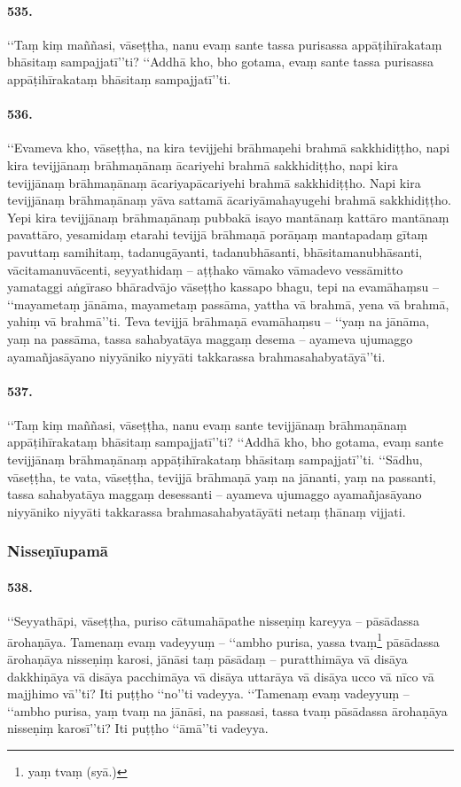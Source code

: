 \paragraph{535.} ‘‘Taṃ kiṃ maññasi, vāseṭṭha, nanu evaṃ sante tassa purisassa appāṭihīrakataṃ bhāsitaṃ sampajjatī’’ti? ‘‘Addhā kho, bho gotama, evaṃ sante tassa purisassa appāṭihīrakataṃ bhāsitaṃ sampajjatī’’ti.

\paragraph{536.} ‘‘Evameva kho, vāseṭṭha, na kira tevijjehi brāhmaṇehi brahmā sakkhidiṭṭho, napi kira tevijjānaṃ brāhmaṇānaṃ ācariyehi brahmā sakkhidiṭṭho, napi kira tevijjānaṃ brāhmaṇānaṃ ācariyapācariyehi brahmā sakkhidiṭṭho. Napi kira tevijjānaṃ brāhmaṇānaṃ yāva sattamā ācariyāmahayugehi brahmā sakkhidiṭṭho. Yepi kira tevijjānaṃ brāhmaṇānaṃ pubbakā isayo mantānaṃ kattāro mantānaṃ pavattāro, yesamidaṃ etarahi tevijjā brāhmaṇā porāṇaṃ mantapadaṃ gītaṃ pavuttaṃ samihitaṃ, tadanugāyanti, tadanubhāsanti, bhāsitamanubhāsanti, vācitamanuvācenti, seyyathidaṃ – aṭṭhako vāmako vāmadevo vessāmitto yamataggi aṅgīraso bhāradvājo vāseṭṭho kassapo bhagu, tepi na evamāhaṃsu – ‘‘mayametaṃ jānāma, mayametaṃ passāma, yattha vā brahmā, yena vā brahmā, yahiṃ vā brahmā’’ti. Teva tevijjā brāhmaṇā evamāhaṃsu – ‘‘yaṃ na jānāma, yaṃ na passāma, tassa sahabyatāya maggaṃ desema – ayameva ujumaggo ayamañjasāyano niyyāniko niyyāti takkarassa brahmasahabyatāyā’’ti.

\paragraph{537.} ‘‘Taṃ kiṃ maññasi, vāseṭṭha, nanu evaṃ sante tevijjānaṃ brāhmaṇānaṃ appāṭihīrakataṃ bhāsitaṃ sampajjatī’’ti? ‘‘Addhā kho, bho gotama, evaṃ sante tevijjānaṃ brāhmaṇānaṃ appāṭihīrakataṃ bhāsitaṃ sampajjatī’’ti. ‘‘Sādhu, vāseṭṭha, te vata, vāseṭṭha, tevijjā brāhmaṇā yaṃ na jānanti, yaṃ na passanti, tassa sahabyatāya maggaṃ desessanti – ayameva ujumaggo ayamañjasāyano niyyāniko niyyāti takkarassa brahmasahabyatāyāti netaṃ ṭhānaṃ vijjati.

\subsubsection{Nisseṇīupamā}

\paragraph{538.} ‘‘Seyyathāpi, vāseṭṭha, puriso cātumahāpathe nisseṇiṃ kareyya – pāsādassa ārohaṇāya. Tamenaṃ evaṃ vadeyyuṃ – ‘‘ambho purisa, yassa tvaṃ\footnote{yaṃ tvaṃ (syā.)} pāsādassa ārohaṇāya nisseṇiṃ karosi, jānāsi taṃ pāsādaṃ – puratthimāya vā disāya dakkhiṇāya vā disāya pacchimāya vā disāya uttarāya vā disāya ucco vā nīco vā majjhimo vā’’ti? Iti puṭṭho ‘‘no’’ti vadeyya. ‘‘Tamenaṃ evaṃ vadeyyuṃ – ‘‘ambho purisa, yaṃ tvaṃ na jānāsi, na passasi, tassa tvaṃ pāsādassa ārohaṇāya nisseṇiṃ karosī’’ti? Iti puṭṭho ‘‘āmā’’ti vadeyya.

